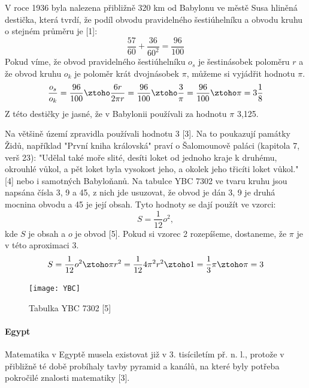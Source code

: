 \documentclass[rocnikovka]{gzwroc} %
\begin{document}
V roce 1936 byla nalezena přibližně 320 km od Babylonu ve městě Susa hliněná destička, která tvrdí, že podíl obvodu pravidelného šestiúhelníku a obvodu kruhu o stejném průměru je [1]:
$$
\frac{57}{60}+\frac{36}{60^2}=\frac{96}{100}
$$
Pokud víme, že obvod pravidelného šestiúhelníku $o_s$ je šestinásobek poloměru $r$ a že obvod kruhu $o_k$ je poloměr krát dvojnásobek $\pi$, můžeme si vyjádřit hodnotu $\pi$.
\begin{equation}
\frac{o_s}{o_k}=\frac{96}{100} \ztoho \frac{6r}{2\pi r}=\frac{96}{100} \ztoho \frac{3}{\pi}=\frac{96}{100} \ztoho\pi=3\frac{1}{8}
\end{equation}
Z této destičky je jasné, že v Babylonii používali za hodnotu $\pi$ 3,125.

Na většině území zpravidla používali hodnotu 3 [3]. Na to poukazují památky Židů, například "První kniha královská" praví o Šalomounově paláci (kapitola 7, verš 23): "Udělal také moře slité, desíti loket od jednoho kraje k druhému, okrouhlé vůkol, a pět loket byla vysokost jeho, a okolek jeho třicíti loket vůkol." [4] nebo i samotných Babyloňanů. Na tabulce YBC 7302 ve tvaru kruhu jsou napsána čísla 3, 9 a 45, z nich jde usuzovat, že obvod je dán 3, 9 je druhá mocnina obvodu a 45 je její obsah. Tyto hodnoty se dají použít ve vzorci:
\begin{equation}
S=\frac{1}{12}o^2,
\end{equation}
kde $S$ je obsah a $o$ je obvod [5]. Pokud si vzorec 2 rozepíšeme, dostaneme, že $\pi$ je v této aproximaci 3.
$$
S=\frac{1}{12}o^2 \ztoho \pi r^2=\frac{1}{12}4\pi^2r^2 \ztoho 1=\frac{1}{3}\pi \ztoho \pi=3
$$
\begin{figure}[!ht]
\texttt{[image: YBC]}
\caption{Tabulka YBC 7302 [5]}
\label{fig:kruh}
\end{figure}
\paragraph{Egypt}
Matematika v Egyptě musela existovat již v 3. tisíciletím př. n. l., protože v přibližně té době probíhaly tavby pyramid a kanálů, na které byly potřeba pokročilé znalosti matematiky [3].
\end{document}
